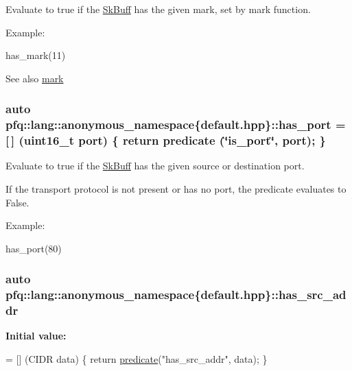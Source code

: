 Evaluate to {\ttfamily true} if the \hyperlink{structpfq_1_1lang_1_1SkBuff}{Sk\+Buff} has the given {\ttfamily mark}, set by mark function. 

Example\+:

has\+\_\+mark(11)

\begin{DoxySeeAlso}{See also}
\hyperlink{namespacepfq_1_1lang_1_1anonymous__namespace_02default_8hpp_03_a7b831baeabda070b89ca862a9445a4a8}{mark} 
\end{DoxySeeAlso}
\subsubsection[{\texorpdfstring{has\+\_\+port}{has_port}}]{\setlength{\rightskip}{0pt plus 5cm}auto pfq\+::lang\+::anonymous\+\_\+namespace\{default.\+hpp\}\+::has\+\_\+port = \mbox{[}$\,$\mbox{]} (uint16\+\_\+t {\bf port}) \{ return {\bf predicate} (\char`\"{}is\+\_\+port\char`\"{}, port); \}}\hypertarget{namespacepfq_1_1lang_1_1anonymous__namespace_02default_8hpp_03_a9f7161b8dfb842c5a845f413eb6bc82f}{}\label{namespacepfq_1_1lang_1_1anonymous__namespace_02default_8hpp_03_a9f7161b8dfb842c5a845f413eb6bc82f}


Evaluate to {\ttfamily true} if the \hyperlink{structpfq_1_1lang_1_1SkBuff}{Sk\+Buff} has the given source or destination port. 

If the transport protocol is not present or has no port, the predicate evaluates to False.

Example\+:

has\+\_\+port(80) 
\subsubsection[{\texorpdfstring{has\+\_\+src\+\_\+addr}{has_src_addr}}]{\setlength{\rightskip}{0pt plus 5cm}auto pfq\+::lang\+::anonymous\+\_\+namespace\{default.\+hpp\}\+::has\+\_\+src\+\_\+addr}\hypertarget{namespacepfq_1_1lang_1_1anonymous__namespace_02default_8hpp_03_acb03dd3e34d6dd7e83d621fa9077194c}{}\label{namespacepfq_1_1lang_1_1anonymous__namespace_02default_8hpp_03_acb03dd3e34d6dd7e83d621fa9077194c}
{\bfseries Initial value\+:}
\begin{DoxyCode}
= [] (CIDR data)
        \{
            \textcolor{keywordflow}{return} \hyperlink{namespacepfq_1_1lang_aca9adafc436b7f851621b979fa1aaf88}{predicate}(\textcolor{stringliteral}{"has\_src\_addr"}, data);
        \}
\end{DoxyCode}


